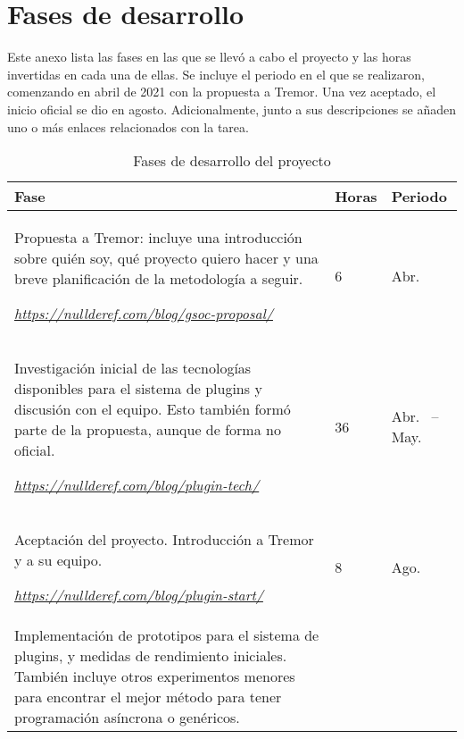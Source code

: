 \chapter{Fases de desarrollo}\label{annex:hours}

Este anexo lista las fases en las que se llevó a cabo el proyecto y las horas
invertidas en cada una de ellas. Se incluye el periodo en el que se realizaron,
comenzando en abril de 2021 con la propuesta a Tremor. Una vez aceptado, el
inicio oficial se dio en agosto. Adicionalmente, junto a sus descripciones se
añaden uno o más enlaces relacionados con la tarea.


\begin{longtable}[H]{| m{9.7cm} | P{1.3cm} | P{3.4cm} |}
\caption{Fases de desarrollo del proyecto}\\

\hline
\textbf{Fase}
    & \textbf{Horas}
    & \textbf{Periodo} \\
\hline
\endhead

Propuesta a Tremor: incluye una introducción sobre quién soy, qué proyecto
quiero hacer y una breve planificación de la metodología a seguir.

\vspace{4mm}
\emph{\url{https://nullderef.com/blog/gsoc-proposal/}}
    & 6
    & Abr.~ \\

\hline
Investigación inicial de las tecnologías disponibles para el sistema de
plugins y discusión con el equipo. Esto también formó parte de la propuesta,
aunque de forma no oficial.

\vspace{4mm}
\emph{\url{https://nullderef.com/blog/plugin-tech/}}
    & 36
    & Abr.~ -- May.~ \\

\hline
Aceptación del proyecto. Introducción a Tremor y a su equipo.

\vspace{4mm}
\emph{\url{https://nullderef.com/blog/plugin-start/}}
    & 8
    & Ago.~ \\

\hline
Implementación de prototipos para el sistema de plugins, y medidas de
rendimiento iniciales. También incluye otros experimentos menores para encontrar
el mejor método para tener programación asíncrona o genéricos.


\end{longtable}
